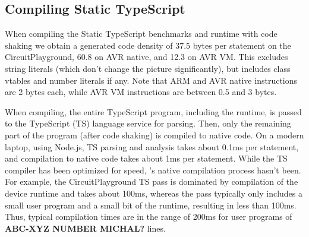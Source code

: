 \subsection{Compiling Static TypeScript}

When compiling the Static TypeScript benchmarks and runtime with code shaking we obtain a generated code density of 37.5 bytes per statement on the CircuitPlayground, 60.8 on AVR native, and 12.3 on AVR VM. This excludes string literals (which don't change the picture significantly), but includes class vtables and number literals if any. Note that ARM and AVR native instructions are 2 bytes each, while AVR VM instructions are between 0.5 and 3 bytes.

When compiling, the entire TypeScript program, including the runtime, is
passed to the TypeScript (TS) language service for parsing. Then, only the remaining part of the program (after code shaking) is compiled to native code.
On a modern laptop, using Node.js, TS parsing and analysis takes about 0.1ms per statement, and \MC compilation to native code takes about 1ms per statement.
While the TS compiler has been optimized for speed, \MCN's native compilation process hasn't been. For example, the CircuitPlayground TS pass is dominated by compilation of the device runtime and takes about 100ms, whereas the \MC pass typically only includes a small user program and a small bit of the runtime, resulting in less than 100ms. Thus, typical compilation times are in the range of 200ms for user programs of \textbf{ABC-XYZ NUMBER MICHAL?} lines.






